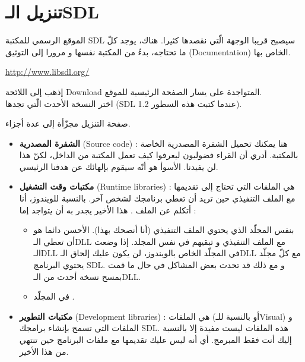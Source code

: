 \section{تنزيل الـ\textenglish{SDL}}

الموقع الرسمي للمكتبة 
\textenglish{SDL}
سيصبح قريبا الوجهة الّتي نقصدها كثيرا. هناك، يوجد كلّ ما تحتاجه، بدءً من المكتبة نفسها و مرورا إلى التوثيق 
(\textenglish{Documentation})
الخاص بها.

\url{http://www.libsdl.org/}

إذهب إلى اللائحة
\textenglish{Download}
المتواجدة على يسار الصفحة الرئيسية للموقع.\\
اختر النسخة الأحدث الّتي تجدها
(\textenglish{SDL 1.2}
عندما كتبت هذه السطور).

صفحة التنزيل مجزّأة إلى عدة أجزاء. 

\begin{itemize}
	\item \textbf{الشفرة المصدرية}
	(\textenglish{Source code}) :
هنا يمكنك تحميل الشفرة المصدرية الخاصة بالمكتبة. أدري أن القراء فضوليون ليعرفوا كيف تعمل المكتبة من الداخل، لكنّ هذا لن يفيدنا. الأسوأ هو أنّه سيقوم بإلهائك عن هدفنا الرئيسي.
	\item \textbf{مكتبات وقت التشغيل}
	(\textenglish{Runtime libraries}) :
	هي الملفات التي تحتاج إلى تقديمها مع الملف التنفيذي حين تريد أن تعطي برنامجك لشخص آخر. بالنسبة للويندوز، أنا أتكلم عن الملف 
	.
	هذا الأخير يجدر به أن يتواجد إما :
	
	\begin{itemize}
		\item بنفس المجلّد الذي يحتوي الملف التنفيذي
		(أنا أنصحك بهذا). الأحسن دائما هو أن تعطي الـ\textenglish{DLL}
		مع الملف التنفيذي و تبقيهم في نفس المجلد. إذا وضعت الـ\textenglish{DLL}
		في المجلّد الخاص بالويندوز، لن يكون عليك إلحاق الـ\textenglish{DLL}
		مع كلّ مجلّد يحتوي البرنامج
		\textenglish{SDL}.
		و مع ذلك قد تحدث بعض المشاكل في حال ما قمت بمسح نسخة أحدث من الـ\textenglish{DLL}.
		\item في المجلّد
		.
	\end{itemize}
	
	\item \textbf{مكتبات التطوير}
	(\textenglish{Development libraries}) :
	هي الملفات
	(أو
	بالنسبة للـ\textenglish{Visual})
	و الملفات 
	التي تسمح بإنشاء برامجك
	\textenglish{SDL}.
	هذه الملفات ليست مفيدة إلا بالنسبة إليك أنت فقط المبرمج. أي أنه ليس عليك تقديمها مع ملفات البرنامج حين تنتهي من هذا الأخير.
\end{itemize}

